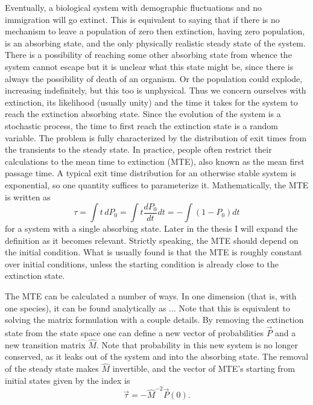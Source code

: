 \documentclass[a4paper,11pt]{article}
\numberwithin{equation}{section} %
\begin{document}
Eventually, a biological system with demographic fluctuations and no immigration will go extinct. 
This is equivalent to saying that if there is no mechanism to leave a population of zero then extinction, having zero population, is an absorbing state, and the only physically realistic steady state of the system. 
There is a possibility of reaching some other absorbing state from whence the system cannot escape but it is unclear what this state might be, since there is always the possibility of death of an organism. 
Or the population could explode, increasing indefinitely, but this too is unphysical. 
Thus we concern ourselves with extinction, its likelihood (usually unity) and the time it takes for the system to reach the extinction absorbing state. 
Since the evolution of the system is a stochastic process, the time to first reach the extinction state is a random variable. 
The problem is fully characterized by the distribution of exit times from the transients to the steady state. 
In practice, people often restrict their calculations to the mean time to extinction (MTE), also known as the mean first passage time. 
A typical exit time distribution for an otherwise stable system is exponential, so one quantity suffices to parameterize it. 
Mathematically, the MTE is written as
\begin{equation*}
 \tau = \int t\, dP_0 = \int t\frac{dP_0}{dt}dt = -\int (1-P_0)dt
\end{equation*}
for a system with a single absorbing state. 
Later in the thesis I will expand the definition as it becomes relevant. 
Strictly speaking, the MTE should depend on the initial condition. What is usually found is that the MTE is roughly constant over initial conditions, unless the starting condition is already close to the extinction state. 

The MTE can be calculated a number of ways. 
In one dimension (that is, with one species), it can be found analytically as
...
Note that this is equivalent to solving the matrix formulation with a couple details. 
By removing the extinction state from the state space one can define a new vector of probabilities $\vec{P}$ and a new transition matrix $\hat{M}$. 
Note that probability in this new system is no longer conserved, as it leaks out of the system and into the absorbing state. 
The removal of the steady state makes $\hat{M}$ invertible, and the vector of MTE's starting from initial states given by the index is
\begin{equation*}
\vec{\tau} = -\hat{M}^{-2}\vec{P}(0). 
\end{equation*}
\end{document}
